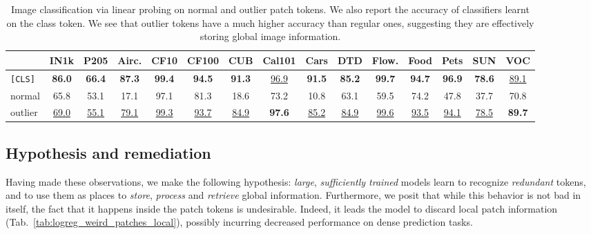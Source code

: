 \documentclass{article} \usepackage{iclr2024_conference,times}
\begin{document}
\begin{table}[t]
  \centering
  \begin{tabular}{@{} l *{14}{c@{\hspace{4pt}}} @{}}
    \toprule
    & IN1k & P205 & Airc. & CF10 & CF100 & CUB & Cal101 & Cars & DTD & Flow. & Food & Pets & SUN & VOC \\
    \midrule
    \texttt{[CLS]} & \textbf{86.0} & \textbf{66.4} & \textbf{87.3} & \textbf{99.4} & \textbf{94.5} & \textbf{91.3} & \underline{96.9} & \textbf{91.5} & \textbf{85.2} & \textbf{99.7} & \textbf{94.7} & \textbf{96.9} & \textbf{78.6} & \underline{89.1} \\
    normal & 65.8 & 53.1 & 17.1 & 97.1 & 81.3 & 18.6 & 73.2 & 10.8 & 63.1 & 59.5 & 74.2 & 47.8 & 37.7 & 70.8 \\
    outlier & \underline{69.0} & \underline{55.1} & \underline{79.1} & \underline{99.3} & \underline{93.7} & \underline{84.9} & \textbf{97.6} & \underline{85.2} & \underline{84.9} & \underline{99.6} & \underline{93.5} & \underline{94.1} & \underline{78.5} & \textbf{89.7} \\
    \bottomrule
  \end{tabular}
  \caption{
    Image classification via linear probing on normal and outlier patch tokens. 
    We also report the accuracy of classifiers learnt on the class token.
    We see that outlier tokens have a much higher accuracy than regular ones, suggesting they are effectively storing global image information.
  }
  \vspace{-1em}
  \label{tab:logreg_weird_patches_image_classif}
\end{table}



\subsection{Hypothesis and remediation}
\label{sec:hypothesis}
Having made these observations, we make the following hypothesis: \emph{large}, \emph{sufficiently trained} models learn to recognize \emph{redundant} tokens, and to use them as places to \emph{store}, \emph{process} and \emph{retrieve} global information.
Furthermore, we posit that while this behavior is not bad in itself, the fact that it happens inside the patch tokens is undesirable.
Indeed, it leads the model to discard local patch information (Tab.~\ref{tab:logreg_weird_patches_local}), possibly incurring decreased performance on dense prediction tasks. 
\end{document}
